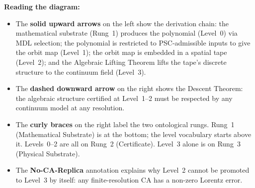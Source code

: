\documentclass[11pt,a4paper]{article}
\begin{document}
\begin{center}
\end{center}

\bigskip
\noindent
\textbf{Reading the diagram:}
\begin{itemize}[itemsep=4pt]
  \item The \textbf{solid upward arrows} on the left show the derivation
    chain: the mathematical substrate (Rung~1) produces the polynomial
    (Level~0) via MDL selection; the polynomial is restricted to
    PSC-admissible inputs to give the orbit map (Level~1); the orbit map
    is embedded in a spatial tape (Level~2); and the Algebraic Lifting
    Theorem lifts the tape's discrete structure to the continuum field
    (Level~3).
  \item The \textbf{dashed downward arrow} on the right shows the Descent
    Theorem: the algebraic structure certified at Level~1--2 must be
    respected by any continuum model at any resolution.
  \item The \textbf{curly braces} on the right label the two ontological
    rungs.
    Rung~1 (Mathematical Substrate) is at the bottom; the level vocabulary
    starts above it.
    Levels~0--2 are all on Rung~2 (Certificate).
    Level~3 alone is on Rung~3 (Physical Substrate).
  \item The \textbf{No-CA-Replica} annotation explains why Level~2 cannot
    be promoted to Level~3 by itself: any finite-resolution CA has a
    non-zero Lorentz error.
\end{itemize}
\end{document}
